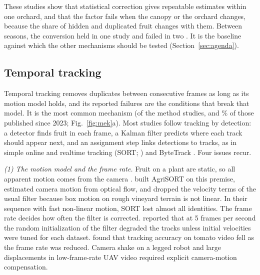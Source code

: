 These studies show that statistical correction gives repeatable estimates within one orchard, and that the factor fails when the canopy or the orchard changes, because the share of hidden and duplicated fruit changes with them. Between seasons, the conversion held in one study \citep{apoloapolo2020deep} and failed in two \citep{koirala2021attempting,linker2018machine}. It is the baseline against which the other mechanisms should be tested (Section~\ref{sec:agenda}).

\subsection{Temporal tracking}\label{sec:mech-track}
Temporal tracking removes duplicates between consecutive frames as long as its motion model holds, and its reported failures are the conditions that break that model. It is the most common mechanism (\nTrack of the \nMethod method studies, and \pTrackRecent\% of those published since 2023; Fig.~\ref{fig:mek}a). Most studies follow tracking by detection: a detector finds fruit in each frame, a Kalman filter predicts where each track should appear next, and an assignment step links detections to tracks, as in simple online and realtime tracking (SORT; \citealp{bewley2016simple}) and ByteTrack \citep{zhang2022bytetrack}. Four issues recur.

\textit{(1) The motion model and the frame rate.} Fruit on a plant are static, so all apparent motion comes from the camera \citep{zhang2022deep,saraceni2024agrisort}. \citet{saraceni2024agrisort} built AgriSORT on this premise, estimated camera motion from optical flow, and dropped the velocity terms of the usual filter because box motion on rough vineyard terrain is not linear. In their sequence with fast non-linear motion, SORT lost almost all identities. The frame rate decides how often the filter is corrected. \citet{wei2025multi} reported that at 5 frames per second the random initialization of the filter degraded the tracks unless initial velocities were tuned for each dataset. \citet{qi2025assessment} found that tracking accuracy on tomato video fell as the frame rate was reduced. Camera shake on a legged robot \citep{zhang2024stablesort} and large displacements in low-frame-rate UAV video \citep{xieli2025pinesort} required explicit camera-motion compensation.

